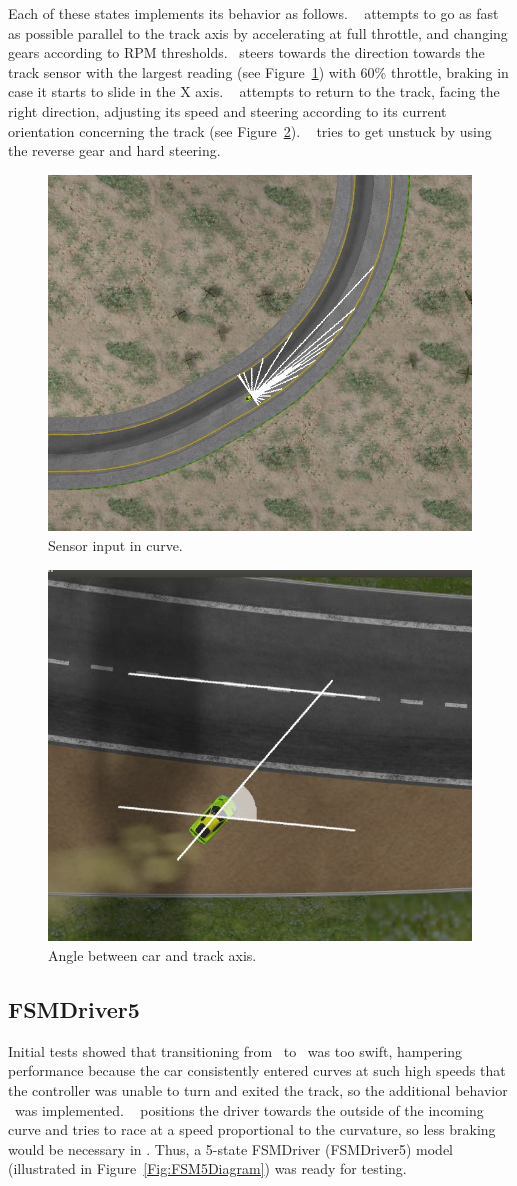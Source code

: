 Each of these states implements its behavior as follows. \SL~ attempts to go as fast as possible parallel to the track axis by accelerating at full throttle, and changing gears according to RPM thresholds. \C~steers towards the direction towards the track sensor with the largest reading (see Figure~\ref{Fig:FSensor}) with 60\% throttle, braking in case it starts to slide in the X axis. \OT~ attempts to return to the track, facing the right direction, adjusting its speed and steering according to its current orientation concerning the track (see Figure~\ref{Fig:Angle}). \St~ tries to get unstuck by using the reverse gear and hard steering.

\begin{figure}[h]
	\centering
	\includegraphics[width=.45\textwidth]{img/FarthestSensor}
	\caption{Sensor input in curve.}
	\label{Fig:FSensor}
\end{figure}

\begin{figure}%
		\centering
		\includegraphics[width=.45\textwidth]{img/ReturnAngle}
		\caption{Angle between car and track axis.}
		\label{Fig:Angle}
\end{figure}

\subsection{FSMDriver5}

Initial tests showed that transitioning from \SL~to \C~was too swift, hampering performance because the car consistently entered curves at such high speeds that the controller was unable to turn and exited the track, so the additional behavior \AC~was implemented. \AC~ positions the driver towards the outside of the incoming curve and tries to race at a speed proportional to the curvature, so less braking would be necessary in \C. Thus, a 5-state FSMDriver (FSMDriver5) model (illustrated in Figure~\ref{Fig:FSM5Diagram}) was ready for testing.

